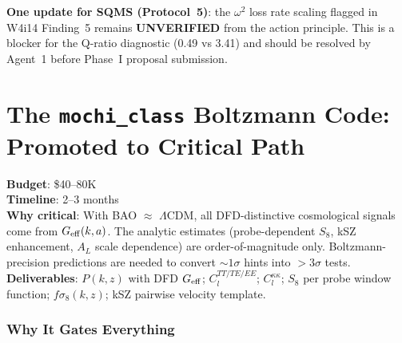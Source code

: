 \documentclass[11pt]{article}
\newcommand{\LCDM}{\Lambda\text{CDM}}
\newcommand{\Geff}{G_{\rm eff}}
\begin{document}
\textbf{One update for SQMS (Protocol~5)}: the $\omega^2$ loss rate
scaling flagged in W4i14 Finding~5 remains \textbf{UNVERIFIED} from
the action principle. This is a blocker for the Q-ratio diagnostic
(0.49 vs 3.41) and should be resolved by Agent~1 before Phase~I
proposal submission.


\part{The \texttt{mochi\_class} Boltzmann Code: Promoted to Critical Path}
\label{part:boltzmann}

\begin{tcolorbox}[colback=red!5!white, colframe=warncolor,
  title=\textbf{CRITICAL PATH: \texttt{mochi\_class} Now Gates All
  Cosmological Predictions}]
\textbf{Budget}: \$40--80K\\
\textbf{Timeline}: 2--3 months\\
\textbf{Why critical}: With BAO $\approx$ $\LCDM$, all DFD-distinctive
cosmological signals come from $\Geff(k,a)$. The analytic estimates
(probe-dependent $S_8$, kSZ enhancement, $A_L$ scale dependence)
are order-of-magnitude only. Boltzmann-precision predictions are needed
to convert $\sim 1\sigma$ hints into $> 3\sigma$ tests.\\
\textbf{Deliverables}: $P(k,z)$ with DFD $\Geff$; $C_l^{TT/TE/EE}$;
$C_l^{\kappa\kappa}$; $S_8$ per probe window function; $f\sigma_8(k,z)$;
kSZ pairwise velocity template.
\end{tcolorbox}

\section{Why It Gates Everything}
\end{document}
